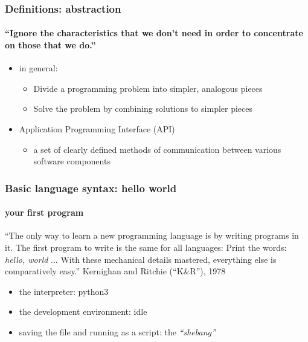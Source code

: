 \documentclass{beamer}
\begin{document}
    \begin{frame}
	    \frametitle{Definitions: abstraction}
	    \framesubtitle{``Ignore the characteristics that we don't need in order to concentrate on those that we do.''}
	    \begin{itemize}
		    \item in general:
			    \begin{itemize}
				    \item Divide a programming problem into simpler, analogous pieces
				    \item Solve the problem by combining solutions to simpler pieces
			    \end{itemize}
		    \item Application Programming Interface (API)
			    \begin{itemize}
				    \item a set of clearly defined methods of communication between various software components
			    \end{itemize}
	    \end{itemize}
    \end{frame}


    \begin{frame}
	    \frametitle{Basic language syntax: hello world}
	    \framesubtitle{your first program}

	    ``The only way to learn a new programming language is by writing programs in it. The first program to write is the same for all languages:
	    Print the words: \textit{hello, world}
	    ...  With these mechanical details mastered, everything else is comparatively easy.''
	    Kernighan and Ritchie (``K\&R''), 1978

	    \begin{itemize}
		    \item the interpreter: python3
		    \item the development environment: idle
		    \item saving the file and running as a script: the \textit{``shebang''}
	    \end{itemize}
    \end{frame}
\end{document}
